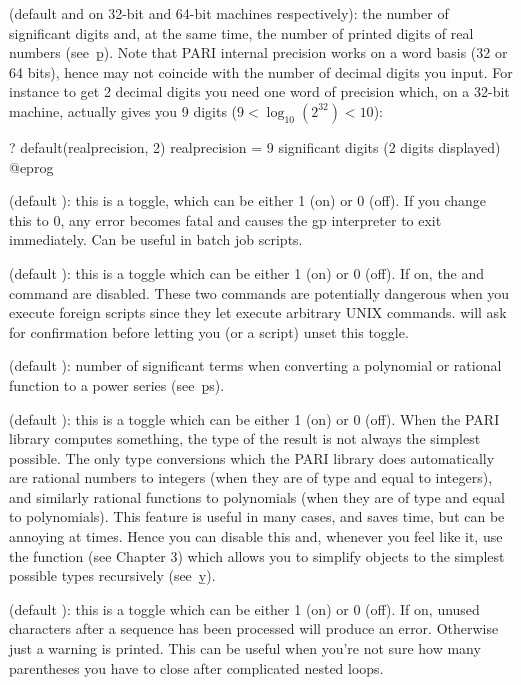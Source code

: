  (default  and  on 32-bit and 64-bit machines respectively): the number of significant digits and, at the same
time, the number of printed digits of real numbers (see~\b{p}). Note that
PARI internal precision works on a word basis (32 or 64 bits), hence may not
coincide with the number of decimal digits you input. For instance to get 2
decimal digits you need one word of precision which, on a 32-bit machine,
actually gives you 9 digits ($9 < \log_{10}(2^{32}) < 10$):

\bprog
? default(realprecision, 2)
      realprecision = 9 significant digits (2 digits displayed)
@eprog

 (default ): this is a toggle, which can be either 1
(on) or 0 (off). If you change this to $0$, any error becomes fatal and
causes the gp interpreter to exit immediately. Can be useful in batch job
scripts.

 (default ): this is a toggle which can be either 1
(on) or 0 (off). If on, the  and  command are
disabled. These two commands are potentially dangerous when you execute
foreign scripts since they let  execute arbitrary UNIX commands.
 will
ask for confirmation before letting you (or a script) unset this toggle.

 (default ): number of significant terms
when converting a polynomial or rational function to a power series
(see~\b{ps}).

 (default ): this is a toggle which can be either
1 (on) or 0 (off). When the PARI library computes something, the type of the
result is not always the simplest possible. The only type conversions which
the PARI library does automatically are rational numbers to integers (when
they are of type  and equal to integers), and similarly rational
functions to polynomials (when they are of type  and equal to
polynomials). This feature is useful in many cases, and saves time, but can
be annoying at times. Hence you can disable this and, whenever you feel like
it, use the function  (see Chapter 3) which allows you to
simplify objects to the simplest possible types recursively (see~\b{y}).

 (default ): this is a toggle which can be
either 1 (on) or 0 (off). If on, unused characters after a sequence has been
processed will produce an error. Otherwise just a warning is printed. This
can be useful when you're not sure how many parentheses you have to close after
complicated nested loops.

